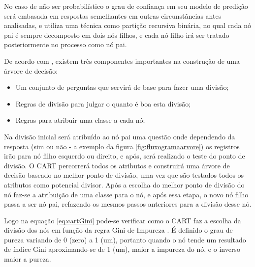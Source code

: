 No caso de não ser probabilístico o grau de confiança em seu modelo de predição será embasada em respostas semelhantes em outras circunstâncias antes analisadas, e utiliza uma técnica como partição recursiva binária, no qual cada nó pai é sempre decomposto em dois nós filhos, e cada nó filho irá ser tratado posteriormente no processo como nó pai.

De acordo com \cite{yohannes1999classification,Raimundo2008}, existem três componentes importantes na construção de uma árvore de decisão:

\begin{itemize}
[noitemsep]
 \item Um conjunto de perguntas que servirá de base para fazer uma divisão;
 \item Regras de divisão para julgar o quanto é boa esta divisão;
 \item Regras para atribuir uma classe a cada nó;
\end{itemize}

Na divisão inicial será atribuído ao nó pai uma questão onde dependendo da resposta (sim ou não - a exemplo da figura \ref{fig:fluxogramaarvore}) os registros irão para nó filho esquerdo ou direito, e após, será realizado o teste do ponto de divisão. O CART percorrerá todos os atributos e construirá uma árvore de decisão baseado no melhor ponto de divisão, uma vez que são testados todos os atributos como potencial divisor. Após a escolha do melhor ponto de divisão do nó faz-se a atribuição de uma classe para o nó, e após essa etapa, o novo nó filho passa a ser nó pai, refazendo os mesmos passos anteriores para a divisão desse nó.


Logo na equação \ref{eq:cartGini} pode-se verificar como o CART faz a escolha da divisão dos nós em função da regra Gini de Impureza  \cite{breiman1984}. É definido o grau de pureza variando de 0 (zero) a 1 (um), portanto quando o nó tende um resultado de índice Gini aproximando-se de 1 (um), maior a impureza do nó, e o inverso maior a pureza. 

